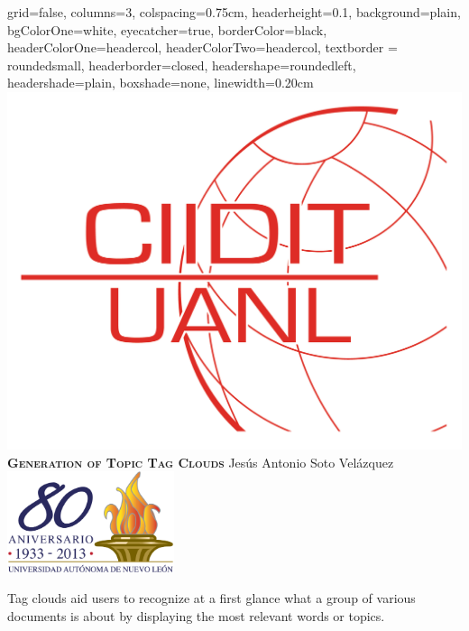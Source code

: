 \documentclass[a0paper, portrait]{baposter}
\begin{document}
\begin{poster}{
    grid=false,
    columns=3,
    colspacing=0.75cm, %
    headerheight=0.1\textheight,
    background=plain,
    bgColorOne=white,
    eyecatcher=true,
    borderColor=black,
    headerColorOne=headercol,
    headerColorTwo=headercol,
    textborder = roundedsmall,
    headerborder=closed,
    headershape=roundedleft,
    headershade=plain,
    boxshade=none,
    linewidth=0.20cm
}
  { \includegraphics[height=0.1\textheight]{ciidit.png} }
  {\bf\textsc{Generation of Topic Tag Clouds}} 
  {
    Jes\'us Antonio Soto Vel\'azquez 
  }
  {
    \includegraphics[height=8.0em]{uanl.png}
  }


   {
    Tag clouds aid users to recognize at a first glance what a group of various documents is about by displaying the most relevant words or topics.
    
}
\end{poster}
\end{document}
